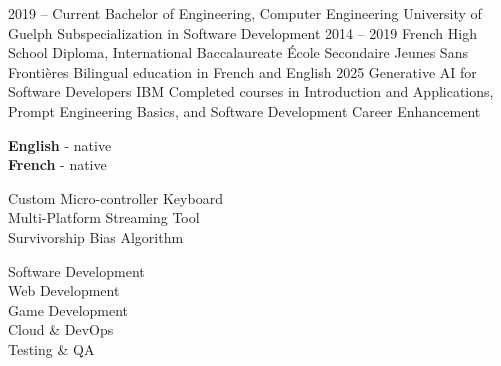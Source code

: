 \documentclass[9pt]{src/developercv} %
\begin{document}


\begin{entrylist}
	\entry
		{2019 -- Current}
		{Bachelor of Engineering, Computer Engineering}
		{University of Guelph}
		{Subspecialization in Software Development}
	\entry
		{2014 -- 2019}
		{French High School Diploma, International Baccalaureate}
		{École Secondaire Jeunes Sans Frontières}
		{Bilingual education in French and English}
	\entry
		{2025}
		{Generative AI for Software Developers}
		{IBM}
		{Completed courses in Introduction and Applications, Prompt Engineering Basics, and Software Development Career Enhancement}
\end{entrylist}


\begin{minipage}[t]{0.3\textwidth}
	\vspace{-\baselineskip}

	
	\textbf{English} - native\\
	\textbf{French} - native
\end{minipage}
\hfill
\begin{minipage}[t]{0.3\textwidth}
	\vspace{-\baselineskip}
	
	
	Custom Micro-controller Keyboard\\
	Multi-Platform Streaming Tool\\
	Survivorship Bias Algorithm
\end{minipage}
\hfill
\begin{minipage}[t]{0.3\textwidth}
	\vspace{-\baselineskip}
	
	
	Software Development\\
	Web Development\\
	Game Development\\
	Cloud \& DevOps\\
	Testing \& QA
\end{minipage}

\end{document}

